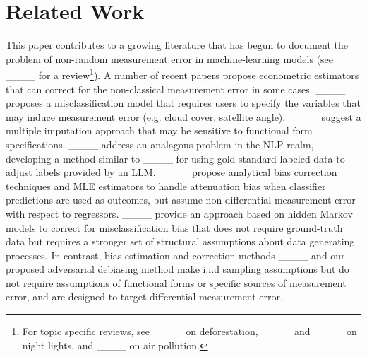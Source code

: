 \section{Related Work}
\label{litreview}
This paper contributes to a growing literature that has begun to document the problem of non-random measurement error in machine-learning models (see ____ for a review\footnote{For topic specific reviews, see ____ on deforestation, ____ and ____ on night lights, and ____ on air pollution.}). A number of recent papers propose econometric estimators that can correct for the non-classical measurement error in some cases. ____ proposes a misclassification model that requires users to specify the variables that may induce measurement error (e.g. cloud cover, satellite angle). ____ suggest a multiple imputation approach that may be sensitive to functional form specifications. ____ address an analagous problem in the NLP realm, developing a method similar to ____ for using gold-standard labeled data to adjust labels provided by an LLM. ____
propose analytical bias correction techniques and MLE estimators to handle attenuation bias when classifier predictions are used as outcomes, but assume non-differential measurement error with respect to regressors. ____ provide an approach based on hidden Markov models to correct for misclassification bias that does not require ground-truth data but requires a stronger set of structural assumptions about data generating processes. In contrast, bias estimation and correction methods ____ and our proposed adversarial debiasing method make i.i.d sampling assumptions but do not require assumptions of functional forms or specific sources of measurement error, and are designed to target differential measurement error.


%